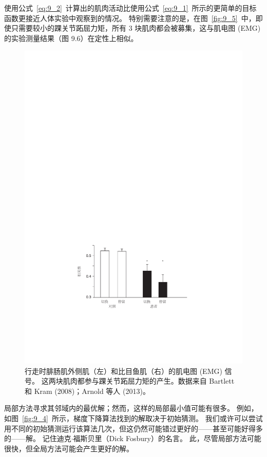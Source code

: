 使用公式~\ref{eq:9_2}~计算出的肌肉活动比使用公式~\ref{eq:9_1}~所示的更简单的目标函数更接近人体实验中观察到的情况。
特别需要注意的是，在图~\ref{fig:9_5}~中，即使只需要较小的踝关节跖屈力矩，所有 3 块肌肉都会被募集，这与肌电图 (EMG) 的实验测量结果（图 9.6）在定性上相似。


\begin{figure}[!htb]
	\centering
	\includegraphics[width=1.0\linewidth]{chap9/9_6}
	\caption{行走时腓肠肌外侧肌（左）和比目鱼肌（右）的肌电图 (EMG) 信号。
		这两块肌肉都参与踝关节跖屈力矩的产生。数据来自 Bartlett 和 Kram (2008)；Arnold 等人 (2013)。 \label{fig:9_6}}
\end{figure}


局部方法寻求其邻域内的最优解；然而，这样的局部最小值可能有很多。
例如，如图~\ref{fig:9_4}~所示，梯度下降算法找到的解取决于初始猜测。
我们或许可以尝试用不同的初始猜测运行该算法几次，但这仍然可能错过更好的——甚至可能好得多的——解。
记住迪克$\cdot$福斯贝里（Dick Fosbury）的名言。
此，尽管局部方法可能很快，但全局方法可能会产生更好的解。



